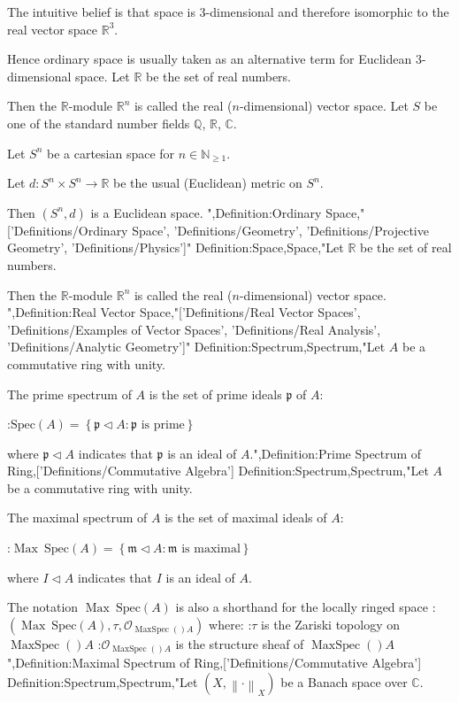 The intuitive belief is that space is $3$-dimensional and therefore isomorphic to the real vector space $\mathbb R^3$.


Hence ordinary space is usually taken as an alternative term for Euclidean $3$-dimensional space.
Let $\mathbb R$ be the set of real numbers.


Then the $\mathbb R$-module $\mathbb R^n$ is called the real ($n$-dimensional) vector space.
Let $S$ be one of the standard number fields $\mathbb Q$, $\mathbb R$, $\mathbb C$.

Let $S^n$ be a cartesian space for $n \in \mathbb N_{\ge 1}$.

Let $d: S^n \times S^n \to \mathbb R$ be the usual (Euclidean) metric on $S^n$.

Then $\left( S^n, d \right)$ is a Euclidean space.
",Definition:Ordinary Space,"['Definitions/Ordinary Space', 'Definitions/Geometry', 'Definitions/Projective Geometry', 'Definitions/Physics']"
Definition:Space,Space,"Let $\mathbb R$ be the set of real numbers.


Then the $\mathbb R$-module $\mathbb R^n$ is called the real ($n$-dimensional) vector space.
",Definition:Real Vector Space,"['Definitions/Real Vector Spaces', 'Definitions/Examples of Vector Spaces', 'Definitions/Real Analysis', 'Definitions/Analytic Geometry']"
Definition:Spectrum,Spectrum,"Let $A$ be a commutative ring with unity.


The prime spectrum of $A$ is the set of prime ideals $\mathfrak p$ of $A$:

:$\mathrm {Spec} \left( A \right) = \left\lbrace \mathfrak p \lhd A: \mathfrak p \text{ is prime}  \right\rbrace$

where $\mathfrak p \lhd A$ indicates that $\mathfrak p$ is an ideal of $A$.",Definition:Prime Spectrum of Ring,['Definitions/Commutative Algebra']
Definition:Spectrum,Spectrum,"Let $A$ be a commutative ring with unity.


The maximal spectrum of $A$ is the set of maximal ideals of $A$:

:$\operatorname{Max} \: \mathrm {Spec} \left( A \right) = \left\lbrace \mathfrak m \lhd A : \mathfrak m \text { is maximal}  \right\rbrace$

where $I \lhd A$ indicates that $I$ is an ideal of $A$.


The notation $\operatorname {Max} \: \mathrm {Spec} \left( A \right)$ is also a shorthand for the locally ringed space
:$\left( \operatorname {Max} \: \mathrm {Spec} \left( A \right), \tau, \mathcal O_{\operatorname {Max Spec}  \left(   \right)A}  \right)$
where:
:$\tau$ is the Zariski topology on $\operatorname {Max Spec}  \left(   \right)A$
:$\mathcal O_{\operatorname {Max Spec}  \left(   \right)A}$ is the structure sheaf of $\operatorname {Max Spec}  \left(   \right)A$",Definition:Maximal Spectrum of Ring,['Definitions/Commutative Algebra']
Definition:Spectrum,Spectrum,"Let $\left( X, \left\lVert \cdot \right\rVert_X \right)$ be a Banach space over $\mathbb C$. 

